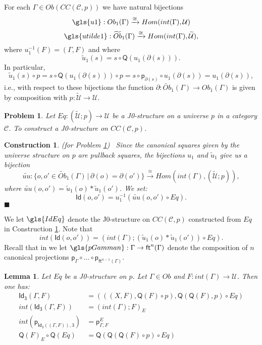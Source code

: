 \documentclass[12pt]{article}
\numberwithin{equation}{section}
\newenvironment{eq}{\begin{equation}}{\end{equation}}
\newtheorem{lemma}[proposition]{Lemma}
\newtheorem{problem}[proposition]{Problem}
\newtheorem{construction0}[proposition]{Construction}
\newenvironment{construction}[1]{\begin{construction0}(for Problem \ref{#1})\ }{$\blacksquare$ \end{construction0}}
\newcommand{\sr}{\rightarrow}
\newcommand{\wt}{\widetilde}
\newcommand{\toCC}{CC} %
\newcommand{\C}{{\mathcal C}}  %
\newcommand{\ft}{\mathsf{ft}}
\newcommand{\p}{\mathsf{p}}
\newcommand{\Id}{\mathsf{Id}} %
\newcommand{\Idx}{\mathsf{Id_3}} %
\newcommand{\U}{\mathcal{U}}
\newcommand{\Q}{\mathsf{Q}}
\newcommand{\Obwt}{\wt{Ob}}
\begin{document}
For each $\Gamma\in Ob(\toCC({\C},p))$ we have natural bijections
%
\begin{eq}
\label{2015.03.27.eq7b} \gls{u1}:Ob_1(\Gamma) \xrightarrow\cong Hom(int(\Gamma),\U)
\end{eq}%
%
\begin{eq}
\label{2015.03.27.eq7a} \gls{utilde1}:\Obwt_1(\Gamma) \xrightarrow\cong Hom(int(\Gamma),\wt{\U}),
\end{eq}%
%
where $u_1^{-1}(F)=(\Gamma,F)$ and where
%
\begin{eq}
\label{2015.03.31.eq5} \wt{u}_1(s)=s\circ \Q(u_1(\partial(s))).
\end{eq}%
%
In particular,
%
$$\wt{u}_1(s)\circ p=s\circ \Q(u_1(\partial(s)))\circ p=s\circ
\p_{\partial(s)}\circ u_1(\partial(s))=u_1(\partial(s)),$$
%
i.e., with respect to these bijections the function
$\partial:\Obwt_1(\Gamma)\sr Ob_1(\Gamma)$ is given by composition with
$p:\wt{\U}\sr \U$.
%
\begin{problem}
\label{2015.03.27.prob3} Let $Eq:(\wt{\U};p)\sr \U$ be a J0-structure on a
universe $p$ in a category $\C$. To construct a J0-structure on
$\toCC({\C},p)$.
\end{problem}
%
\begin{construction}{2015.03.27.prob3}\rm
\label{2015.03.27.constr3} Since the canonical squares given by the universe structure on $p$ are pullback squares,
the bijections $u_1$ and $\wt{u}_1$ give us a bijection
%
$$\wt{uu}:\{o,o'\in\Obwt_1(\Gamma)\,|\,\partial(o)=\partial(o')\} \xrightarrow \cong
Hom(int(\Gamma),(\wt{\U};p)),$$
%
where $\wt{uu}(o,o')=\wt{u}_1(o)*\wt{u}_1(o')$. We set:
%
$$\Id(o,o')=u_1^{-1}(\wt{uu}(o,o')\circ Eq).$$
%
\end{construction}
%
We let $\gls{IdEq}$ denote the J0-structure on $\toCC({\C},p)$ constructed
from $Eq$ in Construction \ref{2015.03.27.constr3}. Note that
%
\begin{eq}
\label{2015.03.31.eq1}
int(\Id(o,o'))=(int(\Gamma);(\wt{u}_1(o)*\wt{u}_1(o'))\circ Eq).
\end{eq}%
%
Recall that in \cite{Csubsystems} we let $\gls{pGamman}:\Gamma\sr \ft^n(\Gamma)$
denote the composition of $n$ canonical projections $\p_{\Gamma}\circ \dots\circ
\p_{\ft^{n-1}(\Gamma)}$.
%
\begin{lemma}
\label{2015.03.27.l1} Let $Eq$ be a J0-structure on $p$. Let $\Gamma\in Ob$
and $F:int(\Gamma)\sr \U$. Then one has:
%
\begin{align}
  \Idx(\Gamma,F) &= (((X,F),\Q(F)\circ p), \Q(\Q(F),p)\circ Eq) \label{2015.03.27.l1-IDx} \\
  int(\Idx(\Gamma,F))&=(int(\Gamma);F)_{E} \\
  int(\p_{\Idx((\Gamma,F)),3}) &= \p^E_{\Gamma,F} \\
  \Q(F)_{E}\circ \Q(Eq)&=\Q(\Q(\Q(F)\circ p)\circ Eq)
\end{align}
%
%
\end{lemma}
\end{document}
